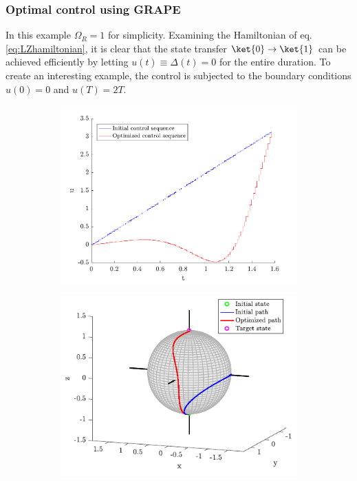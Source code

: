 \subsubsection{Optimal control using GRAPE} 
In this example $\Omega_R = 1$ for simplicity. Examining the Hamiltonian of eq. \eqref{eq:LZhamiltonian}, it is clear that the state transfer $\ket{0} \to \ket{1}$ can be achieved efficiently by letting $u(t) \equiv \Delta (t) = 0$ for the entire duration. To create an interesting example, the control is subjected to the boundary conditions $u(0) = 0$ and $u(T) = 2 T$.\\
\renewcommand{\thesubfigure}{\alph{subfigure}}
\begin{figure}[h!]
\centering %
\begin{subfigure}[b]{0.48\textwidth}
	\caption{}  
  	\includegraphics[width=\textwidth]{Figures/LZcontrol1.pdf}
\end{subfigure}
\hspace{3mm}
\begin{subfigure}[b]{0.48\textwidth}
	\caption{}    
  	\includegraphics[width=\textwidth]{Figures/LZpath1.pdf}
\end{subfigure}


\end{figure}

